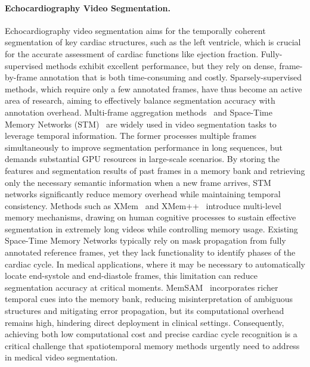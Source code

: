 \paragraph{Echocardiography Video Segmentation.}
    \label{related:evs}
Echocardiography video segmentation aims for the temporally coherent segmentation of key cardiac structures, such as the left ventricle, which is crucial for the accurate assessment of cardiac functions like ejection fraction. Fully-supervised methods exhibit excellent performance, but they rely on dense, frame-by-frame annotation that is both time-consuming and costly. Sparsely-supervised methods, which require only a few annotated frames, have thus become an active area of research, aiming to effectively balance segmentation accuracy with annotation overhead. 
%
Multi-frame aggregation methods~\cite{sokeh2018superframes, liu2018path} and Space-Time Memory Networks (STM)~\cite{oh2019videoobjectsegmentationusing} are widely used in video segmentation tasks to leverage temporal information. The former processes multiple frames simultaneously to improve segmentation performance in long sequences, but demands substantial GPU resources in large-scale scenarios. By storing the features and segmentation results of past frames in a memory bank and retrieving only the necessary semantic information when a new frame arrives, STM networks significantly reduce memory overhead while maintaining temporal consistency. Methods such as XMem~\cite{cheng2022xmemlongtermvideoobject} and XMem++~\cite{bekuzarov2023xmemproductionlevelvideosegmentation} introduce multi-level memory mechanisms, drawing on human cognitive processes to sustain effective segmentation in extremely long videos while controlling memory usage.
%
Existing Space-Time Memory Networks \cite{oh2019videoobjectsegmentationusing, cheng2021rethinkingspacetimenetworksimproved, cheng2022xmemlongtermvideoobject, bekuzarov2023xmemproductionlevelvideosegmentation, cheng2024puttingobjectvideoobject} typically rely on mask propagation from fully annotated reference frames, yet they lack functionality to identify phases of the cardiac cycle. In medical applications, where it may be necessary to automatically locate end-systole and end-diastole frames, this limitation can reduce segmentation accuracy at critical moments. MemSAM~\cite{deng2024memsam} incorporates richer temporal cues into the memory bank, reducing misinterpretation of ambiguous structures and mitigating error propagation, but its computational overhead remains high, hindering direct deployment in clinical settings. Consequently, achieving both low computational cost and precise cardiac cycle recognition is a critical challenge that spatiotemporal memory methods urgently need to address in medical video segmentation.